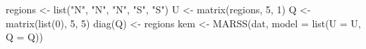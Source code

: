 \begin{Schunk}
\begin{Sinput}
 regions <- list("N", "N", "N", "S", "S")
 U <- matrix(regions, 5, 1)
 Q <- matrix(list(0), 5, 5)
 diag(Q) <- regions
 kem <- MARSS(dat, model = list(U = U, Q = Q))
\end{Sinput}
\end{Schunk}
